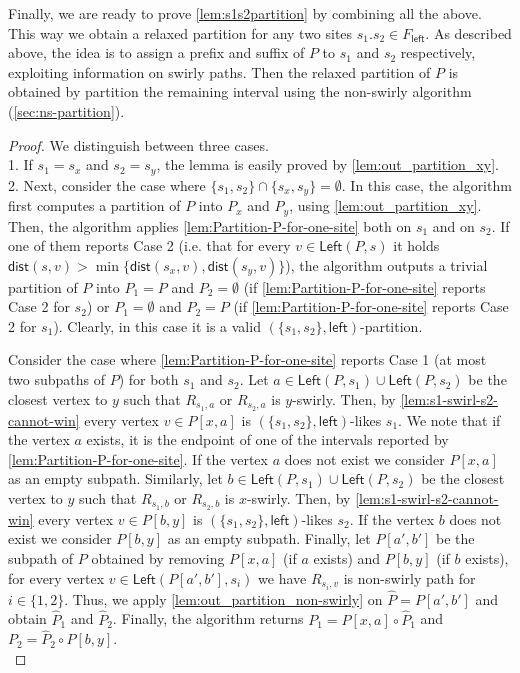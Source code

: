 \documentclass{article}
\newcommand{\Left}{\mathsf{Left}}
\newcommand{\leftside}{\mathsf{left}}
\newcommand{\dist}{\mathsf{dist}}
\begin{document}
Finally, we are ready to prove \cref{lem:s1s2partition} by combining all the above.
This way we obtain a relaxed partition for any two sites $s_1.s_2\in F_{\leftside}$.
As described above, the idea is to assign a prefix and suffix of $P$ to $s_1$ and $s_2$ respectively, exploiting information on swirly paths.
Then the relaxed partition of $P$ is obtained by partition the remaining interval using the non-swirly algorithm (\cref{sec:ns-partition}).

\lemtwositespartition*
\begin{proof}
We distinguish between three cases.\\

1. If $s_1=s_x$ and $s_2=s_y$, the lemma is easily proved by \cref{lem:out_partition_xy}.\\

2. Next, consider the case where $\{s_1,s_2\}\cap \{s_x,s_y\}=\emptyset$.
In this case, the algorithm first computes a partition of $P$ into $P_x$ and $P_y$, using \cref{lem:out_partition_xy}.
Then, the algorithm applies \cref{lem:Partition-P-for-one-site} both on $s_1$ and on $s_2$.
If one of them reports Case 2 (i.e. that for every $v\in \Left(P,s)$ it holds $\dist(s,v)>\min\{\dist(s_x,v),\dist(s_y,v)\}$), the algorithm outputs a trivial partition of $P$ into $P_1=P$ and $P_2=\emptyset$ (if \cref{lem:Partition-P-for-one-site} reports Case 2 for $s_2$) or $P_1=\emptyset$ and $P_2=P$ (if \cref{lem:Partition-P-for-one-site} reports Case 2 for $s_1$).
Clearly, in this case it is a valid $(\{s_1,s_2\},\leftside)$-partition.

Consider the case where \cref{lem:Partition-P-for-one-site} reports Case 1 (at most two subpaths of $P$) for both $s_1$ and $s_2$.
Let $a\in\Left(P,s_1)\cup\Left(P,s_2)$ be the closest vertex to $y$ such that $R_{s_1,a}$ or $R_{s_2,a}$ is $y$-swirly.
Then, by \cref{lem:s1-swirl-s2-cannot-win} every vertex $v\in P[x,a]$ is $(\{s_1,s_2\},\leftside)$-likes $s_1$.
We note that if the vertex $a$ exists, it is the endpoint of one of the intervals reported by \cref{lem:Partition-P-for-one-site}.
If the vertex $a$ does not exist we consider $P[x,a]$ as an empty subpath.
Similarly, let $b\in \Left(P,s_1)\cup\Left(P,s_2)$ be the closest vertex to $y$ such that $R_{s_1,b}$ or $R_{s_2,b}$ is $x$-swirly.
Then, by \cref{lem:s1-swirl-s2-cannot-win} every vertex $v\in P[b,y]$ is $(\{s_1,s_2\},\leftside)$-likes $s_2$.
If the vertex $b$ does not exist we consider $P[b,y]$ as an empty subpath.
Finally, let $P[a',b']$ be the subpath of $P$ obtained by removing $P[x,a]$ (if $a$ exists) and $P[b,y]$ (if $b$ exists),
for every vertex $v\in\Left(P[a',b'],s_i)$ we have $R_{s_i,v}$ is non-swirly path for $i\in\{1,2\}$.
Thus, we apply \cref{lem:out_partition_non-swirly} on $\hat P=P[a',b']$ and obtain $\hat P_1$ and $\hat P_2$.
Finally, the algorithm returns $P_1=P[x,a]\circ \hat P_1$ and $P_2=\hat P_2\circ P[b,y]$.\\


\end{proof}
\end{document}

